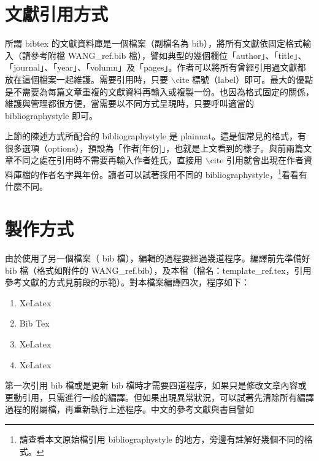 \documentclass[12pt, a4paper]{article}
\begin{document}
\section{文獻引用方式}
所謂 bibtex 的文獻資料庫是一個檔案（副檔名為 bib），將所有文獻依固定格式輸入（請參考附檔 WANG\_ref.bib 檔），譬如典型的幾個欄位「author」、「title」、「journal」、「year」、「volumn」及「pages」。作者可以將所有曾經引用過文獻都放在這個檔案一起維護。需要引用時，只要 $\backslash$cite 標號（label）即可。最大的優點是不需要為每篇文章重複的文獻資料再輸入或複製一份。也因為格式固定的關係，維護與管理都很方便，當需要以不同方式呈現時，只要呼叫適當的 bibliographystyle 即可。

上節的陳述方式所配合的 bibliographystyle 是 {\E plainnat}。這是個常見的格式，有很多選項（options），預設為「作者[年份]」，也就是上文看到的樣子。與前兩篇文章不同之處在引用時不需要再輸入作者姓氏，直接用 $\backslash$cite 引用就會出現在作者資料庫檔的作者名字與年份。讀者可以試著採用不同的 bibliographystyle，\footnote{請查看本文原始檔引用 bibliographystyle 的地方，旁邊有註解好幾個不同的格式。}看看有什麼不同。

\section{製作方式}
由於使用了另一個檔案（ bib 檔），編輯的過程要經過幾道程序。編譯前先準備好 bib 檔（格式如附件的  WANG\_ref.bib），及本檔（檔名：template\_ref.tex，引用參考文獻的方式見前段的示範）。對本檔案編譯四次，程序如下：

\begin{enumerate}
\item XeLatex
\item Bib Tex
\item XeLatex
\item XeLatex
\end{enumerate}


第一次引用 bib 檔或是更新 bib 檔時才需要四道程序，如果只是修改文章內容或更動引用，只需進行一般的編譯。但如果出現異常狀況，可以試著先清除所有編譯過程的附屬檔，再重新執行上述程序。中文的參考文獻與書目譬如 \cite{WANG:2018}

%
%
%
%

%
%



\end{document}
